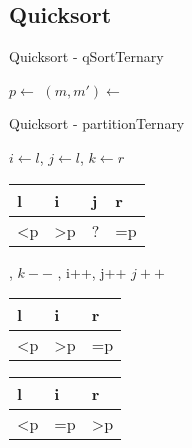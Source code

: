 \documentclass[18pt]{beamer}
\begin{document}
\subsection{Quicksort}
\begin{frame}[fragile]{Quicksort - qSortTernary}
\begin{algorithmic}
   \Return \EndIf
  \State $p \gets $ 
  \State $(m,m') \gets $ 
  \State {}
  \State {}
 \EndProcedure
\end{algorithmic}

\end{frame}

\begin{frame}[fragile]{Quicksort - partitionTernary}
\small
\begin{algorithmic}
  \State $i \gets l$, $j \gets l$, $k \gets r$
  \State \Comment \begin{tabular}{|l|l|l|l|}
	  \hline
	  l & i & j & r \\	  \hline
           \textless p & \textgreater  p & ? & =p \\
           \hline
         \end{tabular}
     , $k--$
     , i++, j++
    \Else \text{ } $j++$
    \EndIf
  \EndWhile
  \State \Comment \begin{tabular}{|l|l|l|}
	  \hline
	  l & i  & r \\	  \hline
           \textless p & \textgreater  p & =p \\
           \hline
         \end{tabular}
     
    \Else \text{ } 
    \EndIf
      \State \Comment \begin{tabular}{|l|l|l|}
	  \hline
	  l & i  & r \\	  \hline
           \textless p & =p & \textgreater  p \\
           \hline
         \end{tabular}
 \EndFunction
\end{algorithmic}

\end{frame}
\end{document}
